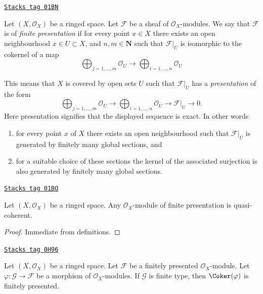 \begin{definition}
\label{modules-definition-finite-presentation}
\href{https://stacks.math.columbia.edu/tag/01BN}{\texttt{Stacks tag 01BN}}

Let $(X, \mathcal{O}_X)$ be a ringed space.
Let $\mathcal{F}$ be a sheaf of $\mathcal{O}_X$-modules.
We say that $\mathcal{F}$ is of {\it finite presentation}
if for every point $x \in X$ there exists an open neighbourhood
$x\in U \subset X$, and  $n, m \in \mathbf{N}$ such that $\mathcal{F}|_U$
is isomorphic to the cokernel of a map
$$
\bigoplus\nolimits_{j = 1, \ldots, m}
\mathcal{O}_U
\longrightarrow
\bigoplus\nolimits_{i = 1, \ldots, n}
\mathcal{O}_U
$$
\end{definition}

This means that $X$ is covered by open sets $U$
such that $\mathcal{F}|_U$ has a {\it presentation}
of the form
$$
\bigoplus\nolimits_{j = 1, \ldots, m}
\mathcal{O}_U
\longrightarrow
\bigoplus\nolimits_{i = 1, \ldots, n}
\mathcal{O}_U
\to
\mathcal{F}|_U
\to
0.
$$
Here presentation signifies that the displayed
sequence is exact. In other words
\begin{enumerate}
\item for every point $x$ of $X$ there exists
an open neighbourhood such that $\mathcal{F}|_U$
is generated by finitely many global sections, and
\item for a suitable choice of these sections
the kernel of the associated surjection is also
generated by finitely many global sections.
\end{enumerate}

\begin{lemma}
\label{modules-lemma-finite-presentation-quasi-coherent}
\href{https://stacks.math.columbia.edu/tag/01BO}{\texttt{Stacks tag 01BO}}

Let $(X, \mathcal{O}_X)$ be a ringed space.
Any $\mathcal{O}_X$-module of finite presentation
is quasi-coherent.
\end{lemma}

\begin{proof}
Immediate from definitions.
\end{proof}

\begin{lemma}
\label{modules-lemma-cokernel-finite-finite-presentation}
\href{https://stacks.math.columbia.edu/tag/0H96}{\texttt{Stacks tag 0H96}}

Let $(X,\mathcal{O}_X)$ be a ringed space. Let $\mathcal{F}$ be a
finitely presented $\mathcal{O}_X$-module. Let
$\varphi : \mathcal{G} \to \mathcal{F}$ be a morphism of
$\mathcal{O}_X$-modules. If $\mathcal{G}$ is finite type, then
$\Coker(\varphi)$ is finitely presented.
\end{lemma}

